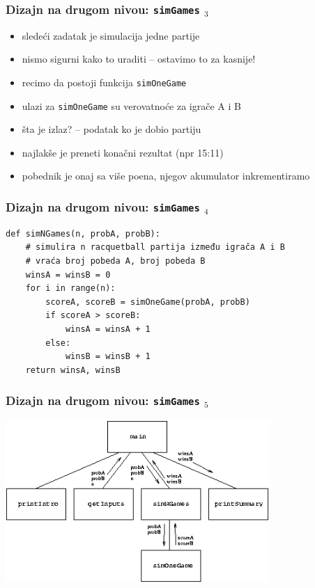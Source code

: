 \documentclass[utf8,compress]{beamer}
\begin{document}
\begin{frame}[fragile]
  \frametitle{Dizajn na drugom nivou: \texttt{simGames} $_3$}
  \begin{itemize}
    \item sledeći zadatak je simulacija jedne partije
    \item nismo sigurni kako to uraditi -- ostavimo to za kasnije!
    \item recimo da postoji funkcija \texttt{simOneGame}
    \item ulazi za \texttt{simOneGame} su verovatnoće za igrače A i B
    \item šta je izlaz? -- podatak ko je dobio partiju
    \item najlakše je preneti konačni rezultat (npr 15:11)
    \item pobednik je onaj sa više poena, njegov akumulator inkrementiramo
  \end{itemize}
\end{frame}

\begin{frame}[fragile]
  \frametitle{Dizajn na drugom nivou: \texttt{simGames} $_4$}
\begin{verbatim}
def simNGames(n, probA, probB):
    # simulira n racquetball partija između igrača A i B
    # vraća broj pobeda A, broj pobeda B
    winsA = winsB = 0
    for i in range(n):
        scoreA, scoreB = simOneGame(probA, probB)
        if scoreA > scoreB:
            winsA = winsA + 1
        else:
            winsB = winsB + 1
    return winsA, winsB
\end{verbatim}
\end{frame}

\begin{frame}[fragile]
  \frametitle{Dizajn na drugom nivou: \texttt{simGames} $_5$}
  \begin{center}
    \includegraphics[width=10cm]{pic23}
  \end{center}
\end{frame}
\end{document}
